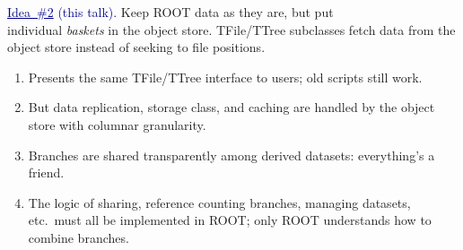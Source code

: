 \documentclass[aspectratio=169]{beamer}
\begin{document}
\begin{frame}{}
\vspace{1 cm}
\begin{center}
\Large \textcolor{darkblue}{\underline{Idea~\#2} (this talk).} Keep ROOT data as they are, but put \\ individual {\it baskets} in the object store. TFile/TTree subclasses fetch data from the object store instead of seeking to file positions.
\end{center}

\begin{enumerate}
\item<2-> Presents the same TFile/TTree interface to users; old scripts still work.
\item<3-> But data replication, storage class, and caching are handled by the object store with columnar granularity.
\item<4-> Branches are shared transparently among derived datasets: everything's a friend.
\item<5-> The logic of sharing, reference counting branches, managing datasets, etc.\ must all be implemented in ROOT; only ROOT understands how to combine branches.
\end{enumerate}

\begin{center}
\end{center}
\end{frame}
\end{document}
